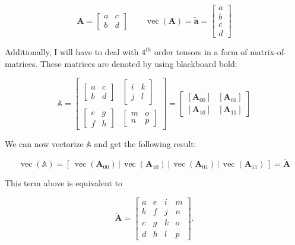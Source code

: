 \[
\mathbf{A} = \begin{bmatrix} a & c \\ b & d \end{bmatrix} \qquad \operatorname{vec}(\mathbf{A}) = \mathbf{\check{a}} = \begin{bmatrix} a \\ b \\ c \\ d \end{bmatrix}
\]

Additionally, I will have to deal with $4^{th}$ order tensors in a form of matrix-of-matrices. These matrices are denoted by using blackboard bold:

\[
\mathbb{A} = 
\left[\begin{array}{cc}{\begin{bmatrix} a & c \\ b & d \end{bmatrix}} & {\begin{bmatrix} i & k \\ j & l \end{bmatrix}} \\ {\begin{bmatrix} e & g \\ f & h \end{bmatrix}} & {\begin{bmatrix} m & o \\ n & p \end{bmatrix}}\end{array}\right]
=
\left[\begin{array}{cc}{\left[\mathbf{A}_{00}\right]} & {\left[\mathbf{A}_{01}\right]} \\ {\left[\mathbf{A}_{10}\right]} & {\left[\mathbf{A}_{11}\right]}\end{array}\right]
\]

We can now vectorize $\mathbb{A}$ and get the following result:

\[
\operatorname{vec}(\mathbb{A}) = \left[ \,\operatorname{vec}\left(\mathbf{A}_{00}\right)\, \bigg| \,\operatorname{vec}\left(\mathbf{A}_{10}\right)\, \bigg| \,\operatorname{vec}\left(\mathbf{A}_{01}\right)\, \bigg| \,\operatorname{vec}\left(\mathbf{A}_{11}\right)\, \right] = \mathbf{\check{A}}
\]

This term above is equivalent to

\[
\mathbf{\check{A}}=\left[\begin{array}{llll}{a} & {e} & {i} & {m} \\ {b} & {f} & {j} & {n} \\ {c} & {g} & {k} & {o} \\ {d} & {h} & {l} & {p}\end{array}\right].
\]


